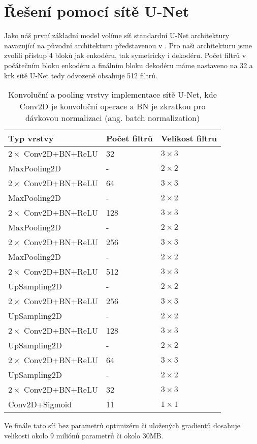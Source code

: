 \section{Řešení pomocí sítě U-Net}
\label{sec:Chapter43}
Jako náš první základní model volíme síť standardní U-Net architektury navazující na původní architekturu představenou v \cite{unet}. Pro naši architekturu jsme zvolili přístup 4 bloků jak enkodéru, tak symetricky i dekodéru. Počet filtrů v počátečním bloku enkodéru a finálním bloku dekodéru máme nastaveno na 32 a krk sítě U-Net tedy odvozeně obsahuje 512 filtrů. 

\begin{table}[ht]
\centering
\begin{tabular}{@{}lll@{}}
\toprule
Typ vrstvy & Počet filtrů & Velikost filtru \\ \midrule
$2\times$ Conv2D+BN+ReLU & 32 & $3 \times 3$ \\
MaxPooling2D & - & $2 \times 2$ \\
$2\times$ Conv2D+BN+ReLU & 64 & $3 \times 3$ \\
MaxPooling2D & - & $2 \times 2$ \\
$2\times$ Conv2D+BN+ReLU & 128 & $3 \times 3$ \\
MaxPooling2D & - & $2 \times 2$ \\
$2\times$ Conv2D+BN+ReLU & 256 & $3 \times 3$ \\
MaxPooling2D & - & $2 \times 2$ \\
$2\times$ Conv2D+BN+ReLU & 512 & $3 \times 3$ \\
UpSampling2D & - & $2 \times 2$ \\
$2\times$ Conv2D+BN+ReLU & 256 & $3 \times 3$ \\
UpSampling2D & - & $2 \times 2$ \\
$2\times$ Conv2D+BN+ReLU & 128 & $3 \times 3$ \\
UpSampling2D & - & $2 \times 2$ \\
$2\times$ Conv2D+BN+ReLU & 64 & $3 \times 3$ \\
UpSampling2D & - & $2 \times 2$ \\
$2\times$ Conv2D+BN+ReLU & 32 & $3 \times 3$ \\
Conv2D+Sigmoid & 11 & $1 \times 1$ \\
\bottomrule
\end{tabular}
\caption[Konvoluční a pooling vrstvy implementace sítě U-Net]{Konvoluční a pooling vrstvy implementace sítě U-Net, kde Conv2D je konvoluční operace a BN je zkratkou pro dávkovou normalizaci (ang. batch normalization) }
\label{fig:model_architecture}
\end{table}

Ve finále tato síť bez parametrů optimizéru či uložených gradientů dosahuje velikosti okolo 9 miliónů parametrů či okolo 30MB.


\endinput